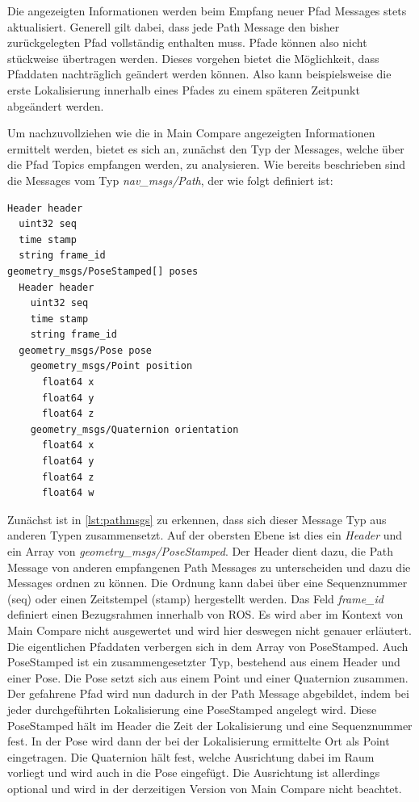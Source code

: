 Die angezeigten Informationen werden beim Empfang neuer Pfad Messages stets
aktualisiert. Generell gilt dabei, dass jede Path Message den bisher
zurückgelegten Pfad vollständig
enthalten muss. Pfade können also nicht stückweise übertragen werden. Dieses vorgehen
bietet die Möglichkeit, dass Pfaddaten nachträglich geändert werden können.
Also kann beispielsweise die erste Lokalisierung innerhalb eines Pfades zu einem
späteren Zeitpunkt abgeändert werden. 

Um nachzuvollziehen wie die in Main Compare angezeigten Informationen ermittelt werden, bietet
es sich an, zunächst den Typ der Messages, welche über die Pfad Topics
empfangen werden, zu analysieren. 
Wie bereits beschrieben sind die Messages vom Typ
\textit{nav\_msgs/Path}, der wie folgt definiert ist:

\begin{lstlisting}[caption=ROS Path Message, label=lst:pathmsgs]
Header header
  uint32 seq
  time stamp
  string frame_id
geometry_msgs/PoseStamped[] poses
  Header header
    uint32 seq
    time stamp
    string frame_id
  geometry_msgs/Pose pose
    geometry_msgs/Point position
      float64 x
      float64 y
      float64 z
    geometry_msgs/Quaternion orientation
      float64 x
      float64 y
      float64 z
      float64 w
\end{lstlisting}

Zunächst ist in \autoref{lst:pathmsgs} zu erkennen, dass sich dieser Message Typ aus anderen Typen
zusammensetzt. Auf der obersten Ebene ist dies ein
\textit{Header} und ein Array von \textit{geometry\_msgs/PoseStamped}.
Der Header dient dazu, die Path Message von anderen empfangenen
Path Messages zu unterscheiden und dazu die Messages ordnen zu können. Die Ordnung kann dabei über eine Sequenznummer
(seq) oder einen Zeitstempel (stamp) hergestellt werden. Das Feld
\textit{frame\_id}
definiert einen Bezugsrahmen innerhalb von ROS. Es wird aber im Kontext von
Main Compare nicht ausgewertet und wird hier deswegen nicht genauer erläutert.
Die eigentlichen Pfaddaten verbergen sich in dem Array von PoseStamped. Auch
PoseStamped ist ein zusammengesetzter Typ, bestehend aus einem Header und einer
Pose. Die Pose setzt sich aus einem Point und einer Quaternion zusammen.
Der gefahrene Pfad wird nun dadurch in der Path Message abgebildet, indem bei
jeder durchgeführten Lokalisierung eine PoseStamped angelegt wird. Diese PoseStamped
hält im Header die Zeit der Lokalisierung und eine Sequenznummer fest. In der
Pose wird dann der bei der Lokalisierung ermittelte Ort als Point eingetragen. Die Quaternion
hält fest, welche Ausrichtung dabei im Raum vorliegt und wird auch
in die Pose eingefügt. Die Ausrichtung ist
allerdings optional und wird in der derzeitigen Version von Main Compare nicht beachtet. 

